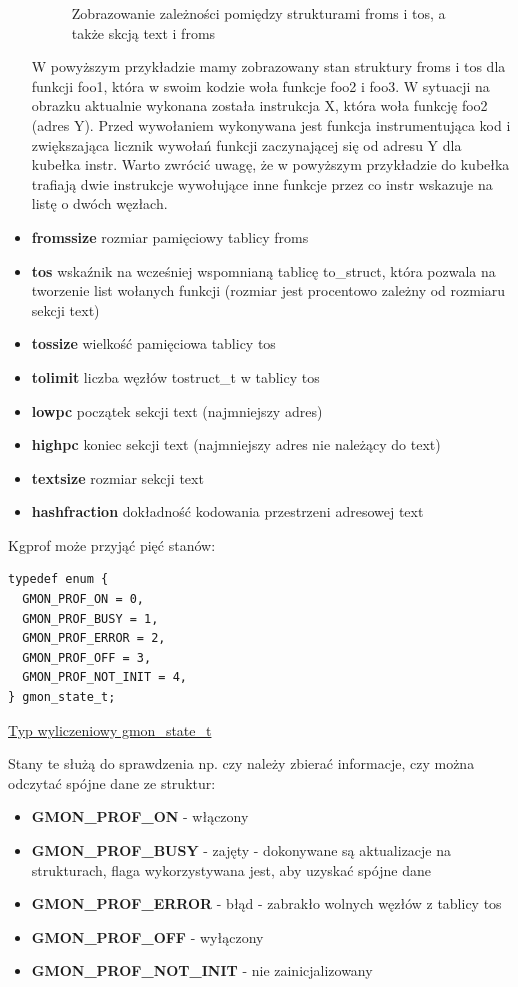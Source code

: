 \documentclass[shortabstract]{iithesis}
\theoremstyle{definition} \newtheorem*{definition}{Definicja}
\theoremstyle{definition} \newtheorem*{example}{Przykład}
\theoremstyle{definition} \newtheorem*{remark}{Uwaga}
\newenvironment{longlisting}{\captionsetup{type=listing}}{}
\begin{document}
\begin{itemize}
\begin{figure}[H]
            \caption{Zobrazowanie zależności pomiędzy strukturami froms i tos, a także skcją text i froms}
        \end{figure}
     W powyższym przykładzie mamy zobrazowany stan struktury froms i tos dla funkcji foo1, która w swoim kodzie woła funkcje foo2 i foo3. W sytuacji na obrazku aktualnie wykonana została instrukcja X, która woła funkcję foo2 (adres Y). Przed wywołaniem wykonywana jest funkcja instrumentująca kod i zwiększająca licznik wywołań funkcji zaczynającej się od adresu Y dla kubełka instr. Warto zwrócić uwagę, że w powyższym przykładzie do kubełka trafiają dwie instrukcje wywołujące inne funkcje przez co instr wskazuje na listę o dwóch węzłach.
    \item \textbf{fromssize} rozmiar pamięciowy tablicy froms
    \item \textbf{tos} wskaźnik na wcześniej wspomnianą tablicę to\_struct, która pozwala na tworzenie list wołanych funkcji (rozmiar jest procentowo zależny od rozmiaru sekcji text)
    \item \textbf{tossize} wielkość pamięciowa tablicy tos
    \item \textbf{tolimit} liczba węzłów tostruct\_t w tablicy tos
    \item \textbf{lowpc} początek sekcji text (najmniejszy adres)
    \item \textbf{highpc} koniec sekcji text (najmniejszy adres nie należący do text)
    \item \textbf{textsize} rozmiar sekcji text
    \item \textbf{hashfraction} dokładność kodowania przestrzeni adresowej text
\end{itemize}

Kgprof może przyjąć pięć stanów:

\begin{longlisting}
  \begin{verbatim}
typedef enum {
  GMON_PROF_ON = 0,
  GMON_PROF_BUSY = 1,
  GMON_PROF_ERROR = 2,
  GMON_PROF_OFF = 3,
  GMON_PROF_NOT_INIT = 4,
} gmon_state_t;
  \end{verbatim}
  \caption{\href{https://mimiker.ii.uni.wroc.pl/source/xref/mimiker/include/sys/gmon.h?r=27b8c19a&mo=4347&fi=136\#136}{Typ wyliczeniowy gmon\_state\_t}}
  \label{lst:enumgmonstate}
\end{longlisting}

Stany te służą do sprawdzenia np. czy należy zbierać informacje, czy można odczytać spójne dane ze struktur:

\begin{itemize}
    \item \textbf{GMON\_PROF\_ON} - włączony
    \item \textbf{GMON\_PROF\_BUSY} - zajęty - dokonywane są aktualizacje na strukturach, flaga wykorzystywana jest, aby uzyskać spójne dane
    \item \textbf{GMON\_PROF\_ERROR} - błąd - zabrakło wolnych węzłów z tablicy tos
    \item \textbf{GMON\_PROF\_OFF} - wyłączony
    \item \textbf{GMON\_PROF\_NOT\_INIT} - nie zainicjalizowany
\end{itemize}
\end{document}
